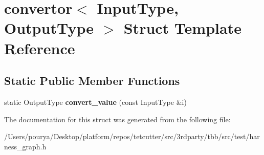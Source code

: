 \hypertarget{structconvertor}{}\section{convertor$<$ Input\+Type, Output\+Type $>$ Struct Template Reference}
\label{structconvertor}
\subsection*{Static Public Member Functions}
\begin{DoxyCompactItemize}
\item 
\hypertarget{structconvertor_ad0745eb5930720859b4b2a4a83451ab8}{}static Output\+Type {\bfseries convert\+\_\+value} (const Input\+Type \&i)\label{structconvertor_ad0745eb5930720859b4b2a4a83451ab8}

\end{DoxyCompactItemize}


The documentation for this struct was generated from the following file\+:\begin{DoxyCompactItemize}
\item 
/\+Users/pourya/\+Desktop/platform/repos/tetcutter/src/3rdparty/tbb/src/test/harness\+\_\+graph.\+h\end{DoxyCompactItemize}
